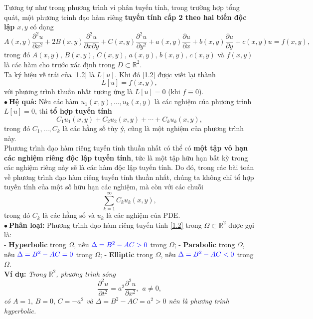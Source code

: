 \documentclass[10pt, a4paper]{article}
\begin{document}
	Tương tự như trong phương trình vi phân tuyến tính, trong trường hợp tổng quát, một phương trình đạo hàm riêng \textbf{\color{red}tuyến tính cấp 2 theo hai biến độc lập $x,y$} có dạng \begin{equation} \tag{1.2} \label{1.2}
		A(x,y)\frac{\partial^2u}{\partial x^2}+2B(x,y)\frac{\partial^2u}{\partial x\partial y}+C(x,y)\frac{\partial^2u}{\partial y^2}+a(x,y)\frac{\partial u}{\partial x}+b(x,y)\frac{\partial u}{\partial y}+c(x,y)u=f(x,y),
	\end{equation}
	trong đó $A(x,y),\,B(x,y),\,C(x,y),\,a(x,y),\,b(x,y),\,c(x,y)$ và $f(x,y)$ là các hàm cho trước xác định trong $D\subset\mathbb R^2$.\\
	
	Ta ký hiệu vế trái của \eqref{1.2} là $L[u]$. Khi đó \eqref{1.2} được viết lại thành $$L[u]=f(x,y),$$
	với phương trình thuần nhất tương ứng là $L[u]=0$ (khi $f\equiv0$).\\
	
	$\bullet~$\textbf{Hệ quả:} Nếu các hàm $u_1(x,y),\ldots,u_k(x,y)$ là các nghiệm của phương trình $L[u]=0$, thì \textbf{\color{red}tổ hợp tuyến tính} $$C_1u_1(x,y)+C_2u_2(x,y)+\cdots+C_ku_k(x,y),$$
	trong đó $C_1,\ldots,C_k$ là các hằng số tùy ý, cũng là một nghiệm của phương trình này.\\
	
	Phương trình đạo hàm riêng tuyến tính thuần nhất có thể có \textbf{\color{red}một tập vô hạn các nghiệm riêng độc lập tuyến tính}, tức là một tập hữu hạn bất kỳ trong các nghiệm riêng này sẽ là các hàm độc lập tuyến tính. Do đó, trong các bài toán về phương trình đạo hàm riêng tuyến tính thuần nhất, chúng ta không chỉ tổ hợp tuyến tính của một số hữu hạn các nghiệm, mà còn với các chuỗi $$\sum_{k=1}^\infty C_ku_k(x,y),$$
	trong đó $C_k$ là các hằng số và $u_k$ là các nghiệm của PDE.\\
	
	$\bullet~$\textbf{Phân loại:} Phương trình đạo hàm riêng tuyến tính \eqref{1.2} trong $\Omega\subset\mathbb R^2$ được gọi là:\\
	
	\quad- \textbf{\color{red}Hyperbolic} trong $\Omega$, nếu $\color{blue}\Delta=B^2-AC>0$ trong $\Omega$;\vskip7pt
	\quad- \textbf{\color{red}Parabolic} trong $\Omega$, nếu $\color{blue}\Delta=B^2-AC=0$ trong $\Omega$;\vskip7pt
	\quad- \textbf{\color{red}Elliptic} trong $\Omega$, nếu $\color{blue}\Delta=B^2-AC<0$ trong $\Omega$.\\
	
	\textbf{Ví dụ:} \textit{Trong $\mathbb R^2$, phương trình sóng} $$\frac{\partial^2u}{\partial t^2}=a^2\frac{\partial^2u}{\partial x^2},~~a\ne0,$$
	\textit{có $A=1,\,B=0,\,C=-a^2$ và $\Delta=B^2-AC=a^2>0$ nên là phương trình hyperbolic.}\\
	
\end{document}
